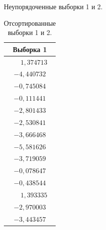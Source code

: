 \begin{table}[h]
  \begin{minipage}[h]{0.49\linewidth}
    \caption{Неупорядоченные выборки 1 и 2.}\label{tab:1}
  \end{minipage}
  \begin{minipage}[h]{0.49\linewidth}
    \caption{Отсортированные выборки 1 и 2.}\label{tab:2}
  \end{minipage}
  \begin{minipage}[h]{0.49\linewidth}
    \begin{center}
      \begin{tabular}{|c|}
        \hline
        Выборка 1 \\
        \hline 
        
          $\phantom{-}1{,}374713$ \\
          \hline 
        
          $-4{,}440732$ \\
          \hline 
        
          $-0{,}745084$ \\
          \hline 
        
          $-0{,}111441$ \\
          \hline 
        
          $-2{,}801433$ \\
          \hline 
        
          $-2{,}530841$ \\
          \hline 
        
          $-3{,}666468$ \\
          \hline 
        
          $-5{,}581626$ \\
          \hline 
        
          $-3{,}719059$ \\
          \hline 
        
          $-0{,}078647$ \\
          \hline 
        
          $-0{,}438544$ \\
          \hline 
        
          $\phantom{-}1{,}393335$ \\
          \hline 
        
          $-2{,}970003$ \\
          \hline 
        
          $-3{,}443457$ \\
          \hline 
        

\end{tabular}
\end{center}
\end{minipage}
\end{table}
